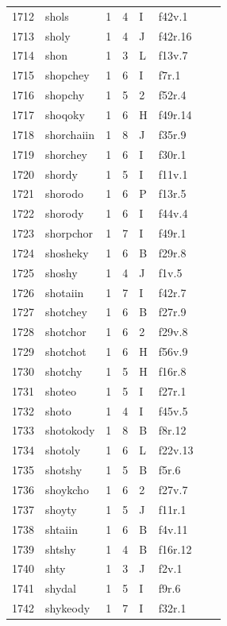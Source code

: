 \documentclass[11pt,a4paper]{article}
\begin{document}
\begin{landscape}
\begin{longtable}{@{}r>{\ttfamily}lrrl>{\ttfamily}l>{\raggedright\arraybackslash}p{80mm}>{\raggedright\arraybackslash}p{36mm}@{}}
1712 & shols & 1 & 4 & I & f42v.1 &  & \\
1713 & sholy & 1 & 4 & J & f42r.16 &  & \\
1714 & shon & 1 & 3 & L & f13v.7 &  & \\
1715 & shopchey & 1 & 6 & I & f7r.1 &  & \\
1716 & shopchy & 1 & 5 & 2 & f52r.4 &  & \\
1717 & shoqoky & 1 & 6 & H & f49r.14 &  & \\
1718 & shorchaiin & 1 & 8 & J & f35r.9 &  & \\
1719 & shorchey & 1 & 6 & I & f30r.1 &  & \\
1720 & shordy & 1 & 5 & I & f11v.1 &  & \\
1721 & shorodo & 1 & 6 & P & f13r.5 &  & \\
1722 & shorody & 1 & 6 & I & f44v.4 &  & \\
1723 & shorpchor & 1 & 7 & I & f49r.1 &  & \\
1724 & shosheky & 1 & 6 & B & f29r.8 &  & \\
1725 & shoshy & 1 & 4 & J & f1v.5 &  & \\
1726 & shotaiin & 1 & 7 & I & f42r.7 &  & \\
1727 & shotchey & 1 & 6 & B & f27r.9 &  & \\
1728 & shotchor & 1 & 6 & 2 & f29v.8 &  & \\
1729 & shotchot & 1 & 6 & H & f56v.9 &  & \\
1730 & shotchy & 1 & 5 & H & f16r.8 &  & \\
1731 & shoteo & 1 & 5 & I & f27r.1 &  & \\
1732 & shoto & 1 & 4 & I & f45v.5 &  & \\
1733 & shotokody & 1 & 8 & B & f8r.12 &  & \\
1734 & shotoly & 1 & 6 & L & f22v.13 &  & \\
1735 & shotshy & 1 & 5 & B & f5r.6 &  & \\
1736 & shoykcho & 1 & 6 & 2 & f27v.7 &  & \\
1737 & shoyty & 1 & 5 & J & f11r.1 &  & \\
1738 & shtaiin & 1 & 6 & B & f4v.11 &  & \\
1739 & shtshy & 1 & 4 & B & f16r.12 &  & \\
1740 & shty & 1 & 3 & J & f2v.1 &  & \\
1741 & shydal & 1 & 5 & I & f9r.6 &  & \\
1742 & shykeody & 1 & 7 & I & f32r.1 &  & \\

\end{longtable}
\end{landscape}
\end{document}
